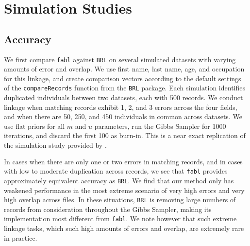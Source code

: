 \documentclass[12pt,letterpaper]{article}
\newcommand{\1}[1]{\mathbb{I}\!\left[#1\right]} %
\begin{document}
\section{Simulation Studies}
\label{sec:simulations}

\hypertarget{accuracy}{%
	\subsection{Accuracy}\label{accuracy}}

We first compare \texttt{fabl} against \texttt{BRL} on several simulated datasets with varying amounts of error and overlap. We use first name, last name, age, and occupation for this linkage, and create comparison vectors according to the default settings of the \texttt{compareRecords} function from the \texttt{BRL} package. Each simulation identifies duplicated individuals between two datasets, each with 500 records. We conduct linkage when matching records exhibit 1, 2, and 3 errors across the four fields, and when there are 50, 250, and 450 individuals in common across datasets. We use flat priors for all $m$ and $u$ parameters, run the Gibbs Sampler for 1000 iterations, and discard the first 100 as burn-in. This is a near exact replication of the simulation study provided by \citep{sadinle2017}. 

In cases when there are only one or two errors in matching records, and in cases with low to moderate duplication across records, we see that \texttt{fabl} provides approximately equivalent accuracy as \texttt{BRL}. 
We find that our method only has weakened performance in the
most extreme scenario of very high errors and very high overlap across
files. In these situations, \texttt{BRL} is removing large numbers of records from consideration throughout the Gibbs Sampler, making its implementation most different from \texttt{fabl}. We note however that such extreme linkage tasks, which such high amounts of errors and overlap, are extremely rare in practice. 

%	
\end{document}
